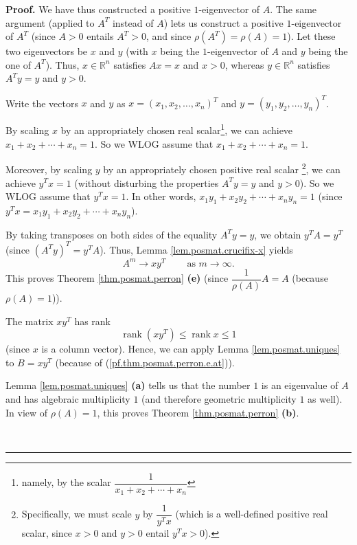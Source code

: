 \documentclass[numbers=enddot,12pt,final,onecolumn,notitlepage]{scrartcl}%
\numberwithin{exer}{subsection}
\theoremstyle{definition}
\newenvironment{proof}[1][Proof]{\noindent\textbf{#1.} }{\ \rule{0.5em}{0.5em}}
\begin{document}
\begin{proof}
We have thus constructed a positive $1$-eigenvector of $A$. The same argument
(applied to $A^{T}$ instead of $A$) lets us construct a positive
$1$-eigenvector of $A^{T}$ (since $A>0$ entails $A^{T}>0$, and since
$\rho\left(  A^{T}\right)  =\rho\left(  A\right)  =1$). Let these two
eigenvectors be $x$ and $y$ (with $x$ being the $1$-eigenvector of $A$ and $y$
being the one of $A^{T}$). Thus, $x\in\mathbb{R}^{n}$ satisfies $Ax=x$ and
$x>0$, whereas $y\in\mathbb{R}^{n}$ satisfies $A^{T}y=y$ and $y>0$.

Write the vectors $x$ and $y$ as $x=\left(  x_{1},x_{2},\ldots,x_{n}\right)
^{T}$ and $y=\left(  y_{1},y_{2},\ldots,y_{n}\right)  ^{T}$.

By scaling $x$ by an appropriately chosen real scalar\footnote{namely, by the
scalar $\dfrac{1}{x_{1}+x_{2}+\cdots+x_{n}}$}, we can achieve $x_{1}%
+x_{2}+\cdots+x_{n}=1$. So we WLOG assume that $x_{1}+x_{2}+\cdots+x_{n}=1$.

Moreover, by scaling $y$ by an appropriately chosen positive real scalar
\footnote{Specifically, we must scale $y$ by $\dfrac{1}{y^{T}x}$ (which is a
well-defined positive real scalar, since $x>0$ and $y>0$ entail $y^{T}x>0$).},
we can achieve $y^{T}x=1$ (without disturbing the properties $A^{T}y=y$ and
$y>0$). So we WLOG assume that $y^{T}x=1$. In other words, $x_{1}y_{1}%
+x_{2}y_{2}+\cdots+x_{n}y_{n}=1$ (since $y^{T}x=x_{1}y_{1}+x_{2}y_{2}%
+\cdots+x_{n}y_{n}$).

By taking transposes on both sides of the equality $A^{T}y=y$, we obtain
$y^{T}A=y^{T}$ (since $\left(  A^{T}y\right)  ^{T}=y^{T}A$). Thus, Lemma
\ref{lem.posmat.crucifix-x} yields
\begin{equation}
A^{m}\rightarrow xy^{T}\ \ \ \ \ \ \ \ \ \ \text{as }m\rightarrow\infty.
\label{pf.thm.posmat.perron.e.at}%
\end{equation}
This proves Theorem \ref{thm.posmat.perron} \textbf{(e)} (since $\dfrac
{1}{\rho\left(  A\right)  }A=A$ (because $\rho\left(  A\right)  =1$)).

The matrix $xy^{T}$ has rank%
\[
\operatorname*{rank}\left(  xy^{T}\right)  \leq\operatorname*{rank}x\leq1
\]
(since $x$ is a column vector). Hence, we can apply Lemma
\ref{lem.posmat.uniques} to $B=xy^{T}$ (because of
(\ref{pf.thm.posmat.perron.e.at})).

Lemma \ref{lem.posmat.uniques} \textbf{(a)} tells us that the number $1$ is an
eigenvalue of $A$ and has algebraic multiplicity $1$ (and therefore geometric
multiplicity $1$ as well). In view of $\rho\left(  A\right)  =1$, this proves
Theorem \ref{thm.posmat.perron} \textbf{(b)}.


\end{proof}
\end{document}

